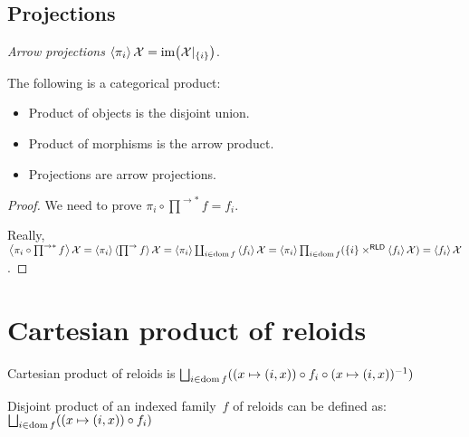 \subsection{Projections}


\begin{defn}
\emph{Arrow projections}
$\left\langle \pi_i\right\rangle\mathcal{X} = \operatorname{im}\bigl(\mathcal{X}|_{\{i\}}\bigr)$.
\end{defn}

\begin{thm}
The following is a categorical product:
\begin{itemize}
\item Product of objects is the disjoint union.
\item Product of morphisms is the arrow product.
\item Projections are arrow projections.
\end{itemize}
\end{thm}

\begin{proof}
We need to prove $\pi_i\circ\prod^{\rightarrow\ast}f=f_i$.

Really, $\left\langle \pi_i\circ\prod^{\rightarrow\ast}f\right\rangle\mathcal{X}=\left\langle \pi_i\right\rangle\left\langle \prod^{\rightarrow}f\right\rangle\mathcal{X}=\left\langle \pi_i\right\rangle\coprod_{i\in\operatorname{dom} f}\left\langle f_i\right\rangle\mathcal{X}=\left\langle \pi_i\right\rangle\prod_{i\in\operatorname{dom} f}(\{i\}\times^{\mathsf{RLD}}\left\langle f_i\right\rangle\mathcal{X})=\left\langle f_i\right\rangle\mathcal{X}$.
\end{proof}

\section{Cartesian product of reloids}

Cartesian product of reloids is $\bigsqcup_{i\in\dom f}((x\mapsto(i,x))\circ f_i\circ(x\mapsto(i,x))^{-1})$

Disjoint product of an indexed family~$f$ of reloids can be defined as:
$\bigsqcup_{i\in\dom f}((x\mapsto(i,x))\circ f_i)$
